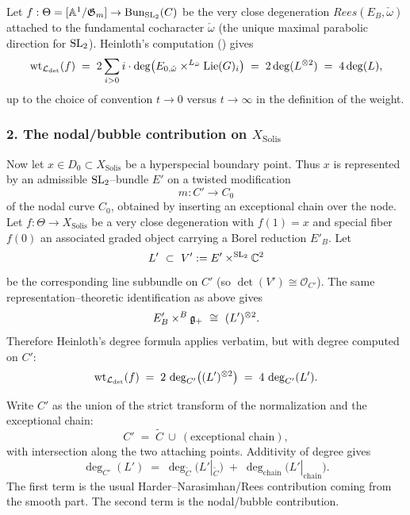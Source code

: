 \documentclass[12pt]{article}
\newcommand{\Rees}{Rees}
\begin{document}
Let $f:\Theta=[\mathbb{A}^1/\mathfrak{G}_m]\to \operatorname{Bun}_{\operatorname{SL}_2}(C)$ be the very close degeneration
$\Rees(E_B,\check\omega)$ attached to the fundamental cocharacter $\check\omega$
(the unique maximal parabolic direction for $\operatorname{SL}_2$).
Heinloth's computation (\cite[\S1.F.c]{Heinloth}) gives
\begin{equation}
\label{eq:heinloth-sl2-weight}
\operatorname{wt}_{\mathcal L_{\det}}(f)
\;=\;
2\sum_{i>0} i\cdot \deg\!\big(E_{0,\check\omega}\times^{L_{\check\omega}}\operatorname{Lie}(G)_i\big)
\;=\;
2\deg(L^{\otimes 2})
\;=\;
4\deg(L),
\end{equation}
up to the choice of convention $t\to 0$ versus $t\to\infty$ in the definition of the weight.

\subsubsection*{2. The nodal/bubble contribution on $X_{\mathrm{Solis}}$}

Now let $x\in D_0\subset X_{\mathrm{Solis}}$ be a hyperspecial boundary point.
Thus $x$ is represented by an admissible $\operatorname{SL}_2$--bundle $E'$ on a twisted
modification
\[
m:C'\longrightarrow C_0
\]
of the nodal curve $C_0$, obtained by inserting an exceptional chain over the node.
Let $f:\Theta\to X_{\mathrm{Solis}}$ be a very close degeneration with $f(1)=x$ and
special fiber $f(0)$ an associated graded object carrying a Borel reduction $E'_B$.
Let
\[
L'\ \subset\ V':=E'\times^{\SL_2}\C^2
\]
be the corresponding line subbundle on $C'$ (so $\det(V')\cong\mathcal O_{C'}$).
The same representation--theoretic identification as above gives
\[
E'_B\times^B \mathfrak{g}_+\ \cong\ (L')^{\otimes 2}.
\]
Therefore Heinloth's degree formula applies verbatim, but with degree computed on $C'$:
\begin{equation}
\label{eq:solis-weight-total-degree}
\operatorname{wt}_{\mathcal L_{\det}}(f)
\;=\;
2\,\deg_{C'}\!\big((L')^{\otimes 2}\big)
\;=\;
4\,\deg_{C'}(L').
\end{equation}

Write $C'$ as the union of the strict transform of the normalization and the
exceptional chain:
\[
C' \;=\; \widetilde C \ \cup\  (\text{exceptional chain}),
\]
with intersection along the two attaching points.  Additivity of degree gives
\begin{equation}
\label{eq:degree-split}
\deg_{C'}(L')
\;=\;
\deg_{\widetilde C}\!\big(L'|_{\widetilde C}\big)
\;+\;
\deg_{\mathrm{chain}}\!\big(L'|_{\mathrm{chain}}\big).
\end{equation}
The first term is the usual Harder--Narasimhan/Rees contribution coming from the
smooth part.  The second term is the nodal/bubble contribution.
\end{document}

